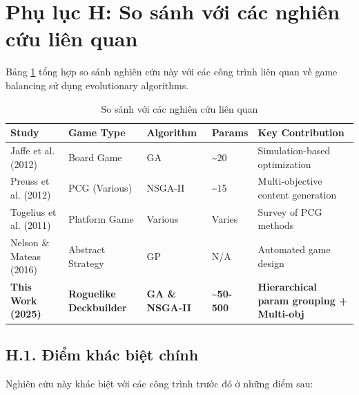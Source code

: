 \section*{Phụ lục H: So sánh với các nghiên cứu liên quan}

Bảng \ref{tab:related_work} tổng hợp so sánh nghiên cứu này với các công trình liên quan về game balancing sử dụng evolutionary algorithms.

\begin{table}[H]
    \centering
    \caption{So sánh với các nghiên cứu liên quan}
    \label{tab:related_work}
    \begin{tabular}{p{3cm} p{2.5cm} p{2cm} p{2cm} p{3cm}}
        \toprule
        \textbf{Study} & \textbf{Game Type} & \textbf{Algorithm} & \textbf{Params} & \textbf{Key Contribution} \\
        \midrule
        Jaffe et al. (2012) \cite{jaffe2012optimizing} & Board Game & GA & \textasciitilde 20 & Simulation-based optimization \\
        \addlinespace
        Preuss et al. (2012) \cite{preuss2012multiobjective} & PCG (Various) & NSGA-II & \textasciitilde 15 & Multi-objective content generation \\
        \addlinespace
        Togelius et al. (2011) \cite{togelius2011search} & Platform Game & Various & Varies & Survey of PCG methods \\
        \addlinespace
        Nelson \& Mateas (2016) \cite{nelson2016towards} & Abstract Strategy & GP & N/A & Automated game design \\
        \addlinespace
        \textbf{This Work (2025)} & \textbf{Roguelike Deckbuilder} & \textbf{GA \& NSGA-II} & \textbf{\textasciitilde 50-500} & \textbf{Hierarchical param grouping + Multi-obj} \\
        \bottomrule
    \end{tabular}
\end{table}

\subsection*{H.1. Điểm khác biệt chính}

Nghiên cứu này khác biệt với các công trình trước đó ở những điểm sau:

